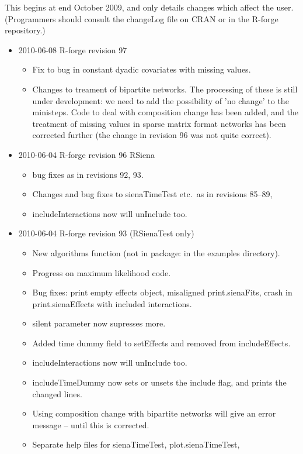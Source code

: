 \documentclass[a4paper,fleqn]{article}
\newcommand{\+}{\, + \,}
\newcommand{\sfn}[1]{\textsf{#1}}
\begin{document}
{This begins at end October 2009, and only details changes which affect the user.
(Programmers should consult the changeLog file on CRAN or in the R-forge
repository.)
\begin{itemize}
\item 2010-06-08 R-forge revision 97
\begin{itemize}
\item Fix to bug in constant dyadic
  covariates with missing values.
\item Changes to treament of bipartite networks. The processing of these is
  still under development: we need to add the possibility of 'no change' to the
  ministeps. Code to deal with composition change has been added, and the
  treatment of missing values in sparse matrix format networks has been
  corrected further (the change in revision 96 was not quite correct).
\end{itemize}
\item 2010-06-04 R-forge revision 96 RSiena
\begin{itemize}
\item bug fixes as in revisions 92, 93.
\item Changes and bug fixes to sienaTimeTest etc.\ as in revisions 85--89,
\item \sfn{includeInteractions} now will unInclude too.
\end{itemize}
\item 2010-06-04 R-forge revision 93 (RSienaTest only)
\begin{itemize}\item New algorithms function
  (not in package: in the examples directory).
\item Progress on maximum likelihood code.
\item Bug fixes: print empty effects object, misaligned print.sienaFits, crash
  in print.sienaEffects with included interactions.
\item silent parameter now supresses more.
\item Added time dummy field to \sfn{setEffects} and removed from
\sfn{includeEffects}.
\item \sfn{includeInteractions} now will unInclude too.
\item \sfn{includeTimeDummy} now sets or unsets the include flag, and prints the
  changed lines.
\item Using composition change with bipartite networks will give an error
  message -- until this is corrected.
\item Separate help files for sienaTimeTest, plot.sienaTimeTest,

\end{itemize}
\end{itemize}}
\end{document}
